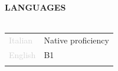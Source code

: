 \documentclass{article}
\begin{document}
\textbf{\textcolor{deepblue}{LANGUAGES}} \\\\ \hfill
\begin{tabular}{ R{4cm} l }
	\textcolor{lightgray}{Italian} & Native proficiency \\ \hfill
	\textcolor{lightgray}{English} & B1                 \\ \hfill
\end{tabular}
\end{document}
